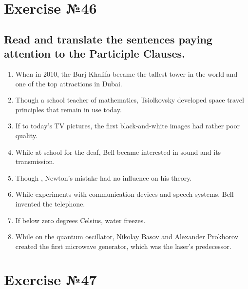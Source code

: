 \section{Exercise №46}

\subsection*{Read and translate the sentences paying attention to the Participle Clauses.}
\begin{enumerate}
      \item When  in 2010, the Burj Khalifa became the tallest tower in the world and one of the top attractions in Dubai.
      \item Though  a school teacher of mathematics, Tsiolkovsky developed space travel principles that remain in use today.
      \item If  to today's TV pictures, the first black-and-white images had rather poor quality.
      \item While  at school for the deaf, Bell became interested in sound and its transmission.
      \item Though , Newton's mistake had no influence on his theory.
      \item While  experiments with communication devices and speech systems, Bell invented the telephone.
      \item If  below zero degrees Celsius, water freezes.
      \item While  on the quantum oscillator, Nikolay Basov and Alexander Prokhorov created the first microwave generator, which was the laser’s predecessor.
\end{enumerate}

\section{Exercise №47}
